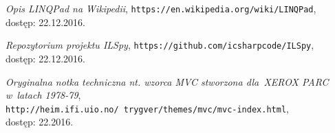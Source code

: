 \documentclass[a4paper,twoside,titlepage,openright]{book}
\begin{document}
\begin{thebibliography}{99}
 \textit{Opis LINQPad na Wikipedii}, 
\texttt{https://en.wikipedia.org/wiki/LINQPad}, \\dostęp: 22.12.2016.

 \textit{Repozytorium projektu ILSpy}, 
\texttt{https://github.com/icsharpcode/ILSpy}, \\dostęp: 22.12.2016.

 \textit{Oryginalna notka techniczna nt. wzorca MVC stworzona dla~XEROX PARC w~latach 1978-79}, \\
\texttt{http://heim.ifi.uio.no/~trygver/themes/mvc/mvc-index.html}, \\dostęp: 22.2016.



\end{thebibliography}
\end{document}
